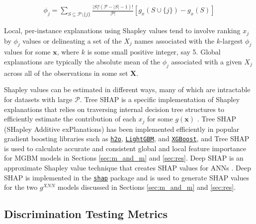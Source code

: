 \documentclass[information,article,submit,moreauthors,pdftex]{definitions/mdpi}
\begin{document}
\begin{equation}
\label{eq:shap_contrib}
\begin{aligned}
\phi_{j} = \sum_{S \subseteq \mathcal{P} \setminus \{j\}}\frac{|S|!(\mathcal{P} -|S| -1)!}{\mathcal{P}!}[g_x(S \cup \{j\}) - g_x(S)]
\end{aligned}
\end{equation}

\noindent Local, per-instance explanations using Shapley values tend to involve ranking $x_j$ by $\phi_j$ values or delineating a set of the $X_j$ names associated with the $k$-largest $\phi_j$ values for some $\mathbf{x}$, where $k$ is some small positive integer, say 5. Global explanations are typically the absolute mean of the $\phi_j$ associated with a given $X_j$ across all of the observations in some set $\mathbf{X}$.

Shapley values can be estimated in different ways, many of which are intractable for datasets with large $\mathcal{P}$. Tree SHAP is a specific implementation of Shapley explanations that relies on traversing internal decision tree structures to efficiently estimate the contribution of each $x_j$ for some $g(\mathbf{x})$ \cite{tree_shap}. Tree SHAP (SHapley Additive exPlanations) has been implemented efficiently in popular gradient boosting libraries such as \href{http://docs.h2o.ai/h2o/latest-stable/h2o-py/docs/modeling.html#h2ogradientboostingestimator}{\texttt{h2o}}, \href{https://lightgbm.readthedocs.io/en/latest/Python-Intro.html}{\texttt{LightGBM}}, and \href{https://xgboost.readthedocs.io/en/latest/python/python_intro.html}{\texttt{XGBoost}}, and Tree SHAP is used to calculate accurate and consistent global and local feature importance for MGBM models in Sections \ref{sec:m_and_m} and \ref{sec:res}. Deep SHAP is an approximate Shapley value technique that creates SHAP values for ANNs \cite{shapley}. Deep SHAP is implemented in the \href{https://github.com/slundberg/shap}{\texttt{shap}} package and is used to generate SHAP values for the two $g^{XNN}$ models discussed in Sections \ref{sec:m_and_m} and \ref{sec:res}.

\subsection{Discrimination Testing Metrics}\label{ssec:di}
\end{document}
